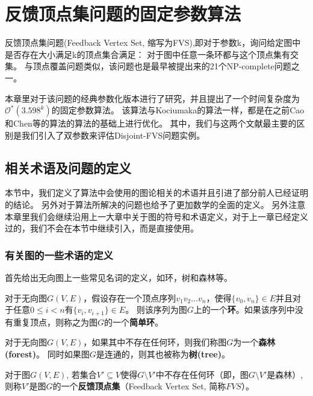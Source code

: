 \chapter{反馈顶点集问题的固定参数算法}
反馈顶点集问题(Feedback Vertex Set, 缩写为FVS),即对于参数k，询问给定图中是否存在大小满足k的顶点集合满足：
对于图中任意一条环都与这个顶点集有交集。
与顶点覆盖问题类似，该问题也是最早被提出来的21个NP-complete问题之一\cite{karp1972reducibility}。

本章里对于该问题的经典参数化版本进行了研究，并且提出了一个时间复杂度为$\mathcal{O}^*(3.598^k)$的固定参数算法。
该算法与Kociumaka的算法一样，都是在之前Cao和Chen等的算法的算法的基础上进行优化。
其中，我们与这两个文献最主要的区别是我们引入了双参数来评估Disjoint-FVS问题实例。

\section{相关术语及问题的定义}
本节中，我们定义了算法中会使用的图论相关的术语并且引进了部分前人已经证明的结论。
另外对于算法所解决的问题也给予了更加数学的全面的定义。
另外注意本章里我们会继续沿用上一大章中关于图的符号和术语定义，对于上一章已经定义过的，我们不会在本节中继续引入，而是直接使用。

\subsection{有关图的一些术语的定义}
首先给出无向图上一些常见名词的定义，如环，树和森林等。
\begin{definition}[环]
对于无向图$G(V,E)$，假设存在一个顶点序列$v_1v_2...v_n$，使得$\{v_0, v_n\} \in E$并且对于任意$0 \le i < n$有$\{v_i, v_{i+1}\} \in E$。
则该序列为图$G$上的一个\textbf{环}。如果该序列中没有重复顶点，则称之为图$G$的一个\textbf{简单环}。
\end{definition}

\begin{definition}
对于无向图$G(V,E)$，如果其中不存在任何环，则我们称图$G$为一个\textbf{森林(forest)}。
同时如果图$G$是连通的，则其也被称为\textbf{树(tree)}。
\end{definition}

\begin{definition}[反馈顶点集]
对于图$G(V, E)$, 若集合$V' \subseteq V$使得$G \setminus V'$中不存在任何环（即，图$G \setminus V'$是森林）,
则称$V'$是图$G$的一个\textbf{反馈顶点集}（Feedback Vertex Set, 简称$FVS$）。
\end{definition}

